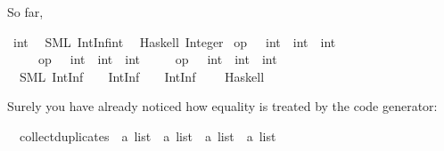 \begin{isabellebody}
\begin{isamarkuptext}
  So far,%
\end{isamarkuptext}%
\isamarkuptrue%
\isamarkupfalse%
\ int\isanewline
\ \ {\isacharparenleft}SML\ {\isachardoublequoteopen}IntInf{\isachardot}int{\isachardoublequoteclose}{\isacharparenright}\isanewline
\ \ {\isacharparenleft}Haskell\ {\isachardoublequoteopen}Integer{\isachardoublequoteclose}{\isacharparenright}\isanewline
\isanewline
{}\isamarkupfalse%
\ {\isachardoublequoteopen}op\ {\isacharplus}\ {\isasymColon}\ int\ {\isasymRightarrow}\ int\ {\isasymRightarrow}\ int{\isachardoublequoteclose}\isanewline
\ \ \ \ \ {\isachardoublequoteopen}op\ {\isacharminus}\ {\isasymColon}\ int\ {\isasymRightarrow}\ int\ {\isasymRightarrow}\ int{\isachardoublequoteclose}\isanewline
\ \ \ \ \ {\isachardoublequoteopen}op\ {\isacharasterisk}\ {\isasymColon}\ int\ {\isasymRightarrow}\ int\ {\isasymRightarrow}\ int{\isachardoublequoteclose}\isanewline
\ \ {\isacharparenleft}SML\ {\isachardoublequoteopen}IntInf{\isachardot}{\isacharplus}\ {\isacharparenleft}{\isacharunderscore}{\isacharcomma}\ {\isacharunderscore}{\isacharparenright}{\isachardoublequoteclose}\ \ {\isachardoublequoteopen}IntInf{\isachardot}{\isacharminus}\ {\isacharparenleft}{\isacharunderscore}{\isacharcomma}\ {\isacharunderscore}{\isacharparenright}{\isachardoublequoteclose}\ \ {\isachardoublequoteopen}IntInf{\isachardot}{\isacharasterisk}\ {\isacharparenleft}{\isacharunderscore}{\isacharcomma}\ {\isacharunderscore}{\isacharparenright}{\isachardoublequoteclose}{\isacharparenright}\isanewline
\ \ {\isacharparenleft}Haskell\ \ {}\ {\isachardoublequoteopen}{\isacharplus}{\isachardoublequoteclose}\ \ \ {}\ {\isachardoublequoteopen}{\isacharminus}{\isachardoublequoteclose}\ \ \ {}\ {\isachardoublequoteopen}{\isacharasterisk}{\isachardoublequoteclose}{\isacharparenright}%
\isamarkuptrue%
%
\isamarkuptrue%
%
\begin{isamarkuptext}%
Surely you have already noticed how equality is treated
  by the code generator:%
\end{isamarkuptext}%
\isamarkuptrue%
\isamarkupfalse%
\isanewline
\ \ collect{\isacharunderscore}duplicates\ {\isacharcolon}{\isacharcolon}\ {\isachardoublequoteopen}{\isacharprime}a\ list\ {\isasymRightarrow}\ {\isacharprime}a\ list\ {\isasymRightarrow}\ {\isacharprime}a\ list\ {\isasymRightarrow}\ {\isacharprime}a\ list{\isachardoublequoteclose}\ \isanewline

\end{isabellebody}
